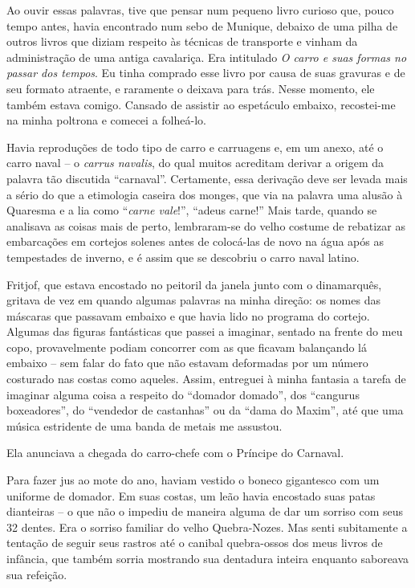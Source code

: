 Ao ouvir essas palavras, tive que pensar num pequeno livro curioso que,
pouco tempo antes, havia encontrado num sebo de Munique, debaixo de uma
pilha de outros livros que diziam respeito às técnicas de transporte e
vinham da administração de uma antiga cavalariça. Era intitulado \emph{O
carro e suas formas no passar dos tempos}. Eu tinha comprado esse livro
por causa de suas gravuras e de seu formato atraente, e raramente o
deixava para trás. Nesse momento, ele também estava comigo. Cansado de
assistir ao espetáculo embaixo, recostei-me na minha poltrona e comecei
a folheá-lo.

Havia reproduções de todo tipo de carro e carruagens e, em um anexo, até
o carro naval -- o \emph{carrus navalis}, do qual muitos acreditam
derivar a origem da palavra tão discutida ``carnaval''. Certamente, essa
derivação deve ser levada mais a sério do que a etimologia caseira dos
monges, que via na palavra uma alusão à Quaresma e a lia como
``\emph{carne vale}!'', ``adeus carne!'' Mais tarde, quando se analisava
as coisas mais de perto, lembraram-se do velho costume de rebatizar as
embarcações em cortejos solenes antes de colocá-las de novo na água após
as tempestades de inverno, e é assim que se descobriu o carro naval
latino.

Fritjof, que estava encostado no peitoril da janela junto com o
dinamarquês, gritava de vez em quando algumas palavras na minha direção:
os nomes das máscaras que passavam embaixo e que havia lido no programa
do cortejo. Algumas das figuras fantásticas que passei a imaginar,
sentado na frente do meu copo, provavelmente podiam concorrer com as que
ficavam balançando lá embaixo -- sem falar do fato que não estavam
deformadas por um número costurado nas costas como aqueles. Assim,
entreguei à minha fantasia a tarefa de imaginar alguma coisa a respeito
do ``domador domado'', dos ``cangurus boxeadores'', do ``vendedor de
castanhas'' ou da ``dama do Maxim'', até que uma música estridente
de uma banda de metais me assustou.

Ela anunciava a chegada do carro-chefe com o Príncipe do Carnaval.

Para fazer jus ao mote do ano, haviam vestido o boneco gigantesco com um
uniforme de domador. Em suas costas, um leão havia encostado suas patas
dianteiras -- o que não o impediu de maneira alguma de dar um sorriso
com seus 32 dentes. Era o sorriso familiar do velho Quebra-Nozes. Mas
senti subitamente a tentação de seguir seus rastros até o canibal
quebra-ossos dos meus livros de infância, que também sorria mostrando
sua dentadura inteira enquanto saboreava sua refeição.

